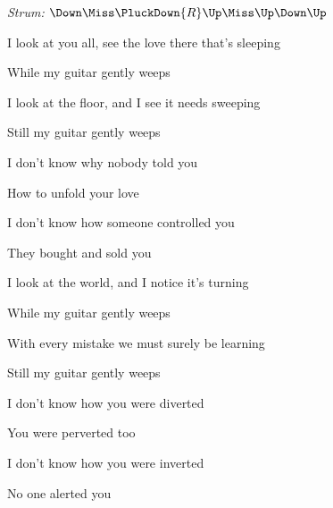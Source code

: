 \begin{song}


\begin{headerbox}
\RaiseBoxWithChucks
\textit{Strum:} $\Down\Miss\PluckDown{R}\Up\Miss\Up\Down\Up$
\end{headerbox}

\begin{hchordbox}
\par
{}
\end{hchordbox}

\Large

\bigskip

I look at you all, see the love there that's sleeping \par
{} While my guitar gently weeps  \par
I look at the floor, and I see it needs sweeping \par
{} Still my guitar gently weeps  \par

\bigskip

 I don't know why  nobody told you \par
{} How to unfold your love \par
{} I don't know how  someone controlled you \par
{} They bought and sold you \par

\bigskip

I look at the world, and I notice it's turning \par
{} While my guitar gently weeps  \par
With every mistake we must surely be learning \par
{} Still my guitar gently weeps  \par

\bigskip

 I don't know how  you were diverted \par
{} You were perverted too \par
{} I don't know how  you were inverted \par
{} No one alerted you \par


\end{song}
